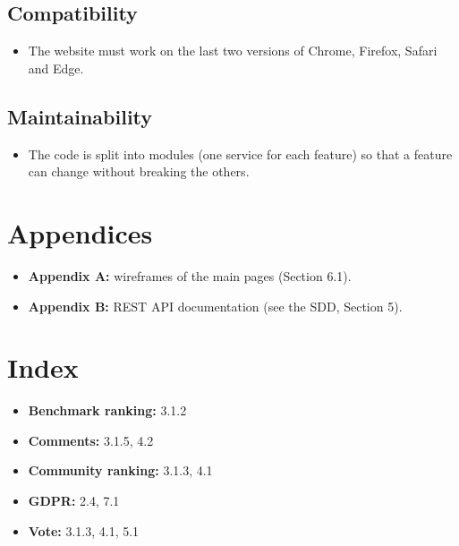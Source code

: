 \documentclass[11pt,a4paper]{article}
\begin{document}
\subsection{Compatibility}

\begin{itemize}
  \item The website must work on the last two versions of Chrome, Firefox, Safari and Edge.
\end{itemize}

\subsection{Maintainability}

\begin{itemize}
  \item The code is split into modules (one service for each feature) so that a feature can change without breaking the others.
\end{itemize}

\section{Appendices}

\begin{itemize}
  \item \textbf{Appendix A:} wireframes of the main pages (Section 6.1).
  \item \textbf{Appendix B:} REST API documentation (see the SDD, Section 5).
\end{itemize}

\section{Index}

\begin{itemize}
  \item \textbf{Benchmark ranking:} 3.1.2
  \item \textbf{Comments:} 3.1.5, 4.2
  \item \textbf{Community ranking:} 3.1.3, 4.1
  \item \textbf{GDPR:} 2.4, 7.1
  \item \textbf{Vote:} 3.1.3, 4.1, 5.1
\end{itemize}
\end{document}
